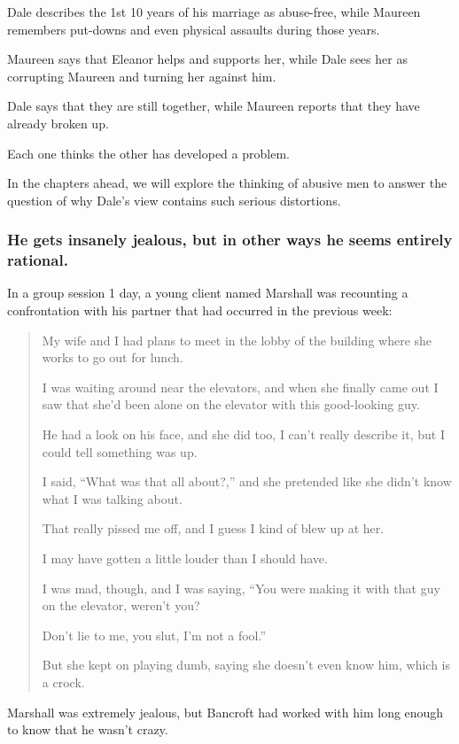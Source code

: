 \documentclass[oneside]{article}
\numberwithin{equation}{section}
\begin{document}
Dale describes the 1st 10 years of his marriage as abuse-free, while Maureen remembers put-downs and even physical assaults during those years.

Maureen says that Eleanor helps and supports her, while Dale sees her as corrupting Maureen and turning her against him.

Dale says that they are still together, while Maureen reports that they have already broken up.

Each one thinks the other has developed a problem.


In the chapters ahead, we will explore the thinking of abusive men to answer the question of why Dale's view contains such serious distortions.

\subsubsection{He gets insanely jealous, but in other ways he seems entirely rational.}
In a group session 1 day, a young client named Marshall was recounting a confrontation with his partner that had occurred in the previous week:
\begin{quotation}
    My wife and I had plans to meet in the lobby of the building where she works to go out for lunch.
    
    I was waiting around near the elevators, and when she finally came out I saw that she'd been alone on the elevator with this good-looking guy.
    
    He had a look on his face, and she did too, I can't really describe it, but I could tell something was up.
    
    I said, ``What was that all about?,'' and she pretended like she didn't know what I was talking about.
    
    That really pissed me off, and I guess I kind of blew up at her.
    
    I may have gotten a little louder than I should have.
    
    I was mad, though, and I was saying, ``You were making it with that guy on the elevator, weren't you?
    
    Don't lie to me, you slut, I'm not a fool.''
    
    But she kept on playing dumb, saying she doesn't even know him, which is a crock.
\end{quotation}
Marshall was extremely jealous, but Bancroft had worked with him long enough to know that he wasn't crazy.
\end{document}
